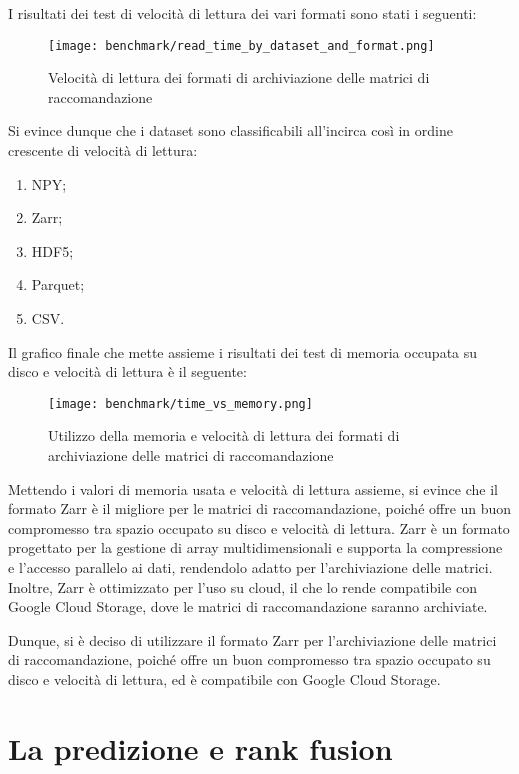 I risultati dei test di velocità di lettura dei vari formati sono stati i seguenti:
\begin{figure}[!h]
    \centering
    \texttt{[image: benchmark/read\_time\_by\_dataset\_and\_format.png]}
    \caption{Velocità di lettura dei formati di archiviazione delle matrici di raccomandazione}
    \label{fig:read-speed-recommendation-matrices}
\end{figure}

Si evince dunque che i dataset sono classificabili all'incirca così in ordine crescente di velocità di lettura:
\begin{enumerate}
    \item NPY;
    \item Zarr;
    \item HDF5;
    \item Parquet;
    \item CSV.
\end{enumerate}

Il grafico finale che mette assieme i risultati dei test di memoria occupata su disco e velocità di lettura è il seguente:

\begin{figure}[!h]
    \centering
    \texttt{[image: benchmark/time\_vs\_memory.png]}
    \caption{Utilizzo della memoria e velocità di lettura dei formati di archiviazione delle matrici di raccomandazione}
    \label{fig:memory-usage-and-read-speed-recommendation-matrices}
\end{figure}

Mettendo i valori di memoria usata e velocità di lettura assieme, si evince che il formato Zarr è il migliore per le matrici di raccomandazione, poiché offre un buon compromesso tra spazio occupato su disco e velocità di lettura. Zarr è un formato progettato per la gestione di array multidimensionali e supporta la compressione e l'accesso parallelo ai dati, rendendolo adatto per l'archiviazione delle matrici. Inoltre, Zarr è ottimizzato per l'uso su cloud, il che lo rende compatibile con Google Cloud Storage, dove le matrici di raccomandazione saranno archiviate.

Dunque, si è deciso di utilizzare il formato Zarr per l'archiviazione delle matrici di raccomandazione, poiché offre un buon compromesso tra spazio occupato su disco e velocità di lettura, ed è compatibile con Google Cloud Storage.


\section{La predizione e rank fusion}

